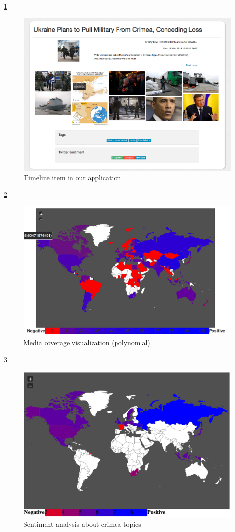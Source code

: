 \documentclass{acm_proc_10ptArticle-sp}
\begin{document}
\ref{screenshot:timeline}
\begin{figure}[H]
  \centering
  \includegraphics[width=0.9\linewidth]{img/timeline-item.png}
  \caption{Timeline item in our application}
  \label{screenshot:timeline}
\end{figure}

\ref{screenshot:coverage}
\begin{figure}[H]
  \centering
  \includegraphics[width=0.9\linewidth]{img/media-coverage-polynomial.png}
  \caption{Media coverage visualization (polynomial)}
  \label{screenshot:coverage}
\end{figure}

\ref{screenshot:crimea}
\begin{figure}[H]
  \centering
  \includegraphics[width=0.9\linewidth]{img/crimea.png}
  \caption{Sentiment analysis about crimea topics}
  \label{screenshot:crimea}
\end{figure}
\end{document}
